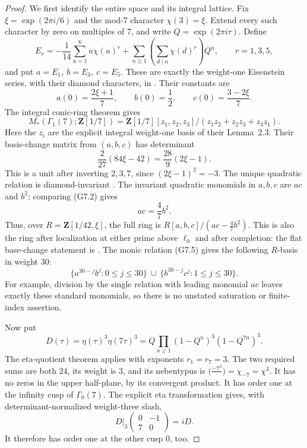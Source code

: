 \begin{proof}
We first identify the entire space and its integral lattice.
Fix \(\xi=\exp(2\pi i/6)\) and the mod-\(7\) character
\(\chi(3)=\xi\). Extend every such character by zero on multiples
of \(7\), and write \(Q=\exp(2\pi i\tau)\). Define
\[
 E_r=-\frac1{14}\sum_{u=1}^6u\chi(u)^r
     +\sum_{n\ge1}\left(\sum_{d\mid n}\chi(d)^r\right)Q^n,
 \qquad r=1,3,5,
\]
and put \(a=E_1,\ b=E_3,\ c=E_5\).
These are exactly the weight-one Eisenstein series, with their
diamond characters, in
\cite[\S2, pp.~8--9]{K17MeierOzornova2020}. Their constants are
\[
 a(0)=\frac{2\xi+1}{7},\qquad b(0)=\frac12,\qquad
 c(0)=\frac{3-2\xi}{7}.
 \tag{G7.2}
\]
The integral conic-ring theorem
\cite[Proposition~2.4 and its proof, pp.~10--11]{K17MeierOzornova2020}
gives
\[
 M_*(\Gamma_1(7);\mathbf Z[1/7])
  =\mathbf Z[1/7][z_1,z_2,z_3]/
       (z_1z_2+z_2z_3+z_3z_1).
 \tag{G7.3}
\]
Here the \(z_i\) are the explicit integral weight-one basis of
their Lemma~2.3. Their basis-change matrix from \((a,b,c)\)
has determinant
\[
 \frac2{27}(84\xi-42)=\frac{28}{9}(2\xi-1).
 \tag{G7.4}
\]
This is a unit after inverting \(2,3,7\), since
\((2\xi-1)^2=-3\).
The unique quadratic relation is diamond-invariant
\cite[Lemma~2.6, p.~11]{K17MeierOzornova2020}.
The invariant quadratic monomials in \(a,b,c\) are \(ac\) and
\(b^2\); comparing (G7.2) gives
\[
 ac=\frac47b^2.
 \tag{G7.5}
\]
Thus, over \(R=\mathbf Z[1/42,\xi]\), the full ring is
\(R[a,b,c]/(ac-\tfrac47b^2)\).
This is also the ring after localization at either prime above
\(\ell_0\) and after completion: the flat base-change statement
is \cite[Lemma~2.1, p.~7]{K17MeierOzornova2020}.
The monic relation (G7.5) gives the following \(R\)-basis in
weight \(30\):
\[
 \{a^{30-j}b^j:0\le j\le30\}
 \ \cup\
 \{b^{30-j}c^j:1\le j\le30\}.
 \tag{G7.6}
\]
For example, division by the single relation with leading
monomial \(ac\) leaves exactly these standard monomials, so
there is no unstated saturation or finite-index assertion.

Now put
\[
 D(\tau)=\eta(\tau)^3\eta(7\tau)^3
        =Q\prod_{n\ge1}(1-Q^n)^3(1-Q^{7n})^3.
 \tag{G7.7}
\]
The eta-quotient theorem
\cite[Theorem~1.1 and Remark~1.2, p.~2]{K17SavittNewman}
applies with exponents \(r_1=r_7=3\). The two required sums
are both \(24\), its weight is \(3\), and its nebentypus is
\(\bigl(\frac{-7^3}{\,\cdot\,}\bigr)=\chi_{-7}=\chi^3\).
It has no zeros in the upper half-plane, by its convergent
product. It has order one at the infinity cusp of
\(\Gamma_0(7)\). The explicit eta transformation
\cite[Proposition~3.1 and its proof, p.~4]{K17SavittNewman}
gives, with determinant-normalized weight-three slash,
\[
 D|_3\begin{pmatrix}0&-1\\7&0\end{pmatrix}=iD.
 \tag{G7.8}
\]
It therefore has order one at the other cusp \(0\), too.


\end{proof}
